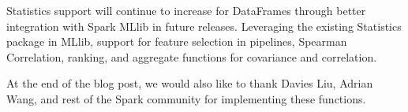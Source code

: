 Statistics support will continue to increase for DataFrames through better integration with Spark MLlib in future releases. Leveraging the existing Statistics package in MLlib, support for feature selection in pipelines, Spearman Correlation, ranking, and aggregate functions for covariance and correlation.

At the end of the blog post, we would also like to thank Davies Liu, Adrian Wang, and rest of the Spark community for implementing these functions.

